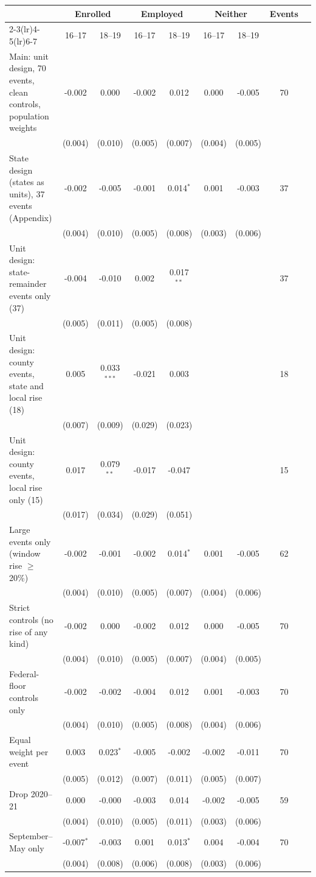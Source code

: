 \begin{tabular}{lcccccccc}
\toprule
 & \multicolumn{2}{c}{Enrolled} & \multicolumn{2}{c}{Employed} & \multicolumn{2}{c}{Neither} & Events \\
\cmidrule(lr){2-3}\cmidrule(lr){4-5}\cmidrule(lr){6-7}
 & 16--17 & 18--19 & 16--17 & 18--19 & 16--17 & 18--19 & \\
\midrule
Main: unit design, 70 events, clean controls, population weights & -0.002 & 0.000 & -0.002 & 0.012 & 0.000 & -0.005 & 70 \\
 & (0.004) & (0.010) & (0.005) & (0.007) & (0.004) & (0.005) &  \\
State design (states as units), 37 events (Appendix) & -0.002 & -0.005 & -0.001 & 0.014$^{*}$ & 0.001 & -0.003 & 37 \\
 & (0.004) & (0.010) & (0.005) & (0.008) & (0.003) & (0.006) &  \\
Unit design: state-remainder events only (37) & -0.004 & -0.010 & 0.002 & 0.017$^{**}$ &  &  & 37 \\
 & (0.005) & (0.011) & (0.005) & (0.008) &  &  &  \\
Unit design: county events, state and local rise (18) & 0.005 & 0.033$^{***}$ & -0.021 & 0.003 &  &  & 18 \\
 & (0.007) & (0.009) & (0.029) & (0.023) &  &  &  \\
Unit design: county events, local rise only (15) & 0.017 & 0.079$^{**}$ & -0.017 & -0.047 &  &  & 15 \\
 & (0.017) & (0.034) & (0.029) & (0.051) &  &  &  \\
Large events only (window rise $\geq$ 20\%) & -0.002 & -0.001 & -0.002 & 0.014$^{*}$ & 0.001 & -0.005 & 62 \\
 & (0.004) & (0.010) & (0.005) & (0.007) & (0.004) & (0.006) &  \\
Strict controls (no rise of any kind) & -0.002 & 0.000 & -0.002 & 0.012 & 0.000 & -0.005 & 70 \\
 & (0.004) & (0.010) & (0.005) & (0.007) & (0.004) & (0.005) &  \\
Federal-floor controls only & -0.002 & -0.002 & -0.004 & 0.012 & 0.001 & -0.003 & 70 \\
 & (0.004) & (0.010) & (0.005) & (0.008) & (0.004) & (0.006) &  \\
Equal weight per event & 0.003 & 0.023$^{*}$ & -0.005 & -0.002 & -0.002 & -0.011 & 70 \\
 & (0.005) & (0.012) & (0.007) & (0.011) & (0.005) & (0.007) &  \\
Drop 2020--21 & 0.000 & -0.000 & -0.003 & 0.014 & -0.002 & -0.005 & 59 \\
 & (0.004) & (0.010) & (0.005) & (0.011) & (0.003) & (0.006) &  \\
September--May only & -0.007$^{*}$ & -0.003 & 0.001 & 0.013$^{*}$ & 0.004 & -0.004 & 70 \\
 & (0.004) & (0.008) & (0.006) & (0.008) & (0.003) & (0.006) &  \\
\bottomrule
\end{tabular}
